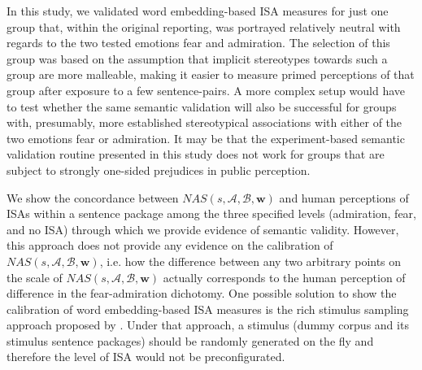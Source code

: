 In this study, we validated word embedding-based ISA measures for just one group that, within the original reporting, was portrayed relatively neutral with regards to the two tested emotions fear and admiration. The selection of this group was based on the assumption that implicit stereotypes towards such a group are more malleable, making it easier to measure primed perceptions of that group after exposure to a few sentence-pairs. A more complex setup would have to test whether the same semantic validation will also be successful for groups with, presumably, more established stereotypical associations with either of the two emotions fear or admiration. It may be that the experiment-based semantic validation routine presented in this study does not work for groups that are subject to strongly one-sided prejudices in public perception.

We show the concordance between $NAS(s, \mathcal{A}, \mathcal{B}, \boldsymbol{w})$ and human perceptions of ISAs within a sentence package among the three specified levels (admiration, fear, and no ISA) through which we provide evidence of semantic validity. However, this approach does not provide any evidence on the calibration \parencite{lindhiem:2018:ICC} of $NAS(s, \mathcal{A}, \mathcal{B}, \boldsymbol{w})$, i.e. how the difference between any two arbitrary points on the scale of $NAS(s, \mathcal{A}, \mathcal{B}, \boldsymbol{w})$ actually corresponds to the human perception of difference in the fear-admiration dichotomy. One possible solution to show the calibration of word embedding-based ISA measures is the rich stimulus sampling approach proposed by \textcite{young:2011:R}. Under that approach, a stimulus (dummy corpus and its stimulus sentence packages) should be randomly generated on the fly and therefore the level of ISA would not be preconfigurated.

